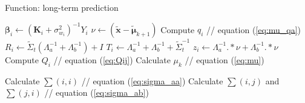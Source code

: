 \begin{algorithm}
\caption{Function: long-term prediction }
\label{alg:long_term_prediction}
\renewcommand{\algorithmicrequire}{\textbf{Input:}}
\renewcommand{\algorithmicensure}{\textbf{Output:}}
    \begin{algorithmic}
    \end{algorithmic}
\begin{algorithmic}[1]
            \State $\boldsymbol{\beta}_i \gets \left(\boldsymbol{K}_i+\sigma_{w_i}^2\right)^{-1} {Y_i} $ 
            \State $\nu \gets \left(\tilde{\boldsymbol{x}}-\tilde{\boldsymbol{\mu}}_{k+1}\right)$
            \State Compute $q_i$ \qquad \qquad // equation (\ref{eq:mu_qa})
            \State ${R_i}  \gets \tilde{{\Sigma}}_t\left({\Lambda}_a^{-1}+{\Lambda}_b^{-1}\right)+{I}$ 
            \State ${T_i} \gets {\Lambda}_a^{-1}+{\Lambda}_b^{-1}+\tilde{{\Sigma}}_t^{-1}$
            \State ${z}_{i} \gets \Lambda_a^{-1}.*{\nu}+{\Lambda}_b^{-1}.*{\nu}$
            \State Compute $ Q_{i}$ \qquad \qquad // equation (\ref{eq:Qij})
        \EndFor
        \State Calculate $\mu_k$ \qquad \qquad // equation (\ref{eq:mu})
    \EndFor
    
                \State Calculate $\sum(i,i)$   \qquad \qquad // equation (\ref{eq:sigma_aa})
            \Else
                \State Calculate $\sum(i,j)$ and $\sum(j,i)$ \qquad \qquad // equation (\ref{eq:sigma_ab})
            \EndIf
        \EndFor
    \EndFor

\end{algorithmic}
\end{algorithm}





